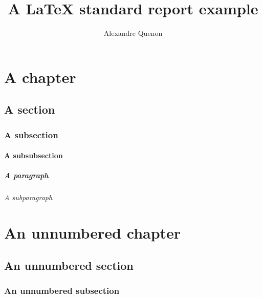 \documentclass[11pt, a4paper]{report}
\title{A \LaTeX{} standard report example}
\author{Alexandre Quenon}
\begin{document}

\maketitle

\tableofcontents


\chapter{A chapter}

	\lipsum[1]


	\section{A section}
	
		\lipsum[2]
		
		
		\subsection{A subsection}
		
			\lipsum[3]
			
			
			\subsubsection{A subsubsection}
			
				\lipsum[4]
				
				
				\paragraph{A paragraph}
				
					\lipsum[5]
					
					
					\subparagraph{A subparagraph}
					
						\lipsum[6]
	

\chapter*{An unnumbered chapter}

	\lipsum[1]
	
	
	\section*{An unnumbered section}
	
		\lipsum[2]
		
		
		\subsection*{An unnumbered subsection}
		
			\lipsum[3]




\end{document}
